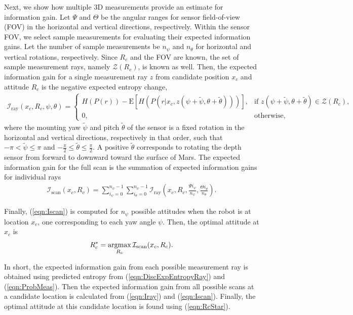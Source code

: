 \documentclass[conf]{new-aiaa}
\newcommand{\refeqn}[1]{(\ref{eqn:#1})}
\newcommand{\argmax}{\operatornamewithlimits{argmax}}
\begin{document}
Next, we show how multiple 3D measurements provide an estimate for information gain. Let $\Psi$ and $\Theta$ be the angular ranges for sensor field-of-view (FOV) in the horizontal and vertical directions, respectively. Within the sensor FOV, we select sample measurements for evaluating their expected information gains. Let the number of sample measurements be $n_\psi$ and $n_\theta$ for horizontal and vertical rotations, respectively. Since $R_c$ and the FOV are known, the set of sample measurement rays, namely $\mathcal{Z}(R_c)$, is known as well. Then, the expected information gain for a single measurement ray $z$ from candidate position $x_c$ and attitude $R_c$ is the negative expected entropy change,
\begin{align}
\label{eqn:Iray}
\mathcal{I}_\text{ray}(x_c,R_c,\psi,\theta)=
\begin{cases}
H(P(r))-\text{E}[H(P(r|x_c,z(\psi+\tilde{\psi},\theta+\tilde{\theta})))], & \mbox{if } z(\psi+\tilde{\psi},\theta+\tilde{\theta})\in\mathcal{Z}(R_c), \\ 
0,                                                                                    & \mbox{otherwise},
\end{cases}
\end{align}
where the mounting yaw $\tilde{\psi}$ and pitch $\tilde{\theta}$ of the sensor is a fixed rotation in the horizontal and vertical directions, respectively in that order, such that $-\pi<\tilde{\psi}\leq\pi$ and $-\frac{\pi}{2}\leq\tilde{\theta}\leq\frac{\pi}{2}$. A positive $\tilde{\theta}$ corresponds to rotating the depth sensor from forward to downward toward the surface of Mars. The expected information gain for the full scan is the summation of expected information gains for individual rays
\begin{align}
\label{eqn:Iscan}
\mathcal{I}_\text{scan}(x_c,R_c)=\sum_{i_\psi=0}^{n_\psi-1}\sum_{i_\theta=0}^{n_\psi-1}\mathcal{I}_\text{ray}\left(x_c,R_c,\frac{\Psi i_\psi}{n_\psi},\frac{\Theta i_\theta}{n_\theta}\right).
\end{align}

Finally, \refeqn{Iscan} is computed for $n_\psi$ possible attitudes when the robot is at location $x_c$, one corresponding to each yaw angle $\psi$. Then, the optimal attitude at $x_c$ is
\begin{align}
\label{eqn:RcStar}
R_c^*=\argmax_{R_c} \mathcal{I}_\text{scan}(x_c,R_c).
\end{align}

In short, the expected information gain from each possible measurement ray is obtained using predicted entropy from \refeqn{DiscExpEntropyRay} and \refeqn{ProbMeas}. Then the expected information gain from all possible scans at a candidate location is calculated from \refeqn{Iray} and \refeqn{Iscan}. Finally, the optimal attitude at this candidate location is found using \refeqn{RcStar}.
\end{document}
